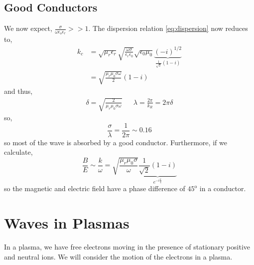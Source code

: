 \documentclass{book}
\begin{document}
\subsection{Good Conductors}
We now expect, $\frac{\sigma}{\omega\epsilon_o\epsilon_r} >> 1$. The dispersion relation \eqref{eq:dispersion} now reduces to,
\begin{equation}
	\begin{split}
	k_c & = \sqrt{\mu_r\epsilon_r}\sqrt{\frac{\omega\sigma}{\epsilon_r\epsilon_0}}\sqrt{\epsilon_0\mu_0}\underbrace{(-i)^{1/2}}_{\frac{1}{\sqrt{2}}(1-i)} \\
	& = \sqrt{\frac{\mu_r\mu_0\sigma\omega}{2}}(1-i)
\end{split}
\end{equation}
and thus,
\begin{align}
	\delta = \sqrt{\frac{2}{\mu_r\mu_0\sigma\omega}} &&\lambda = \frac{2\pi}{k_R} = 2\pi\delta
\end{align}
so,
\begin{equation}
	\frac{\sigma}{\lambda} = \frac{1}{2\pi} \sim 0.16
\end{equation}
so most of the wave is absorbed by a good conductor. Furthermore, if we calculate,
\begin{equation}
	\frac{B}{E} \sim \frac{k}{\omega} = \sqrt{\frac{\mu_r\mu_0\sigma}{\omega}}\underbrace{\frac{1}{\sqrt{2}}(1-i)}_{e^{-i\frac{\pi}{4}}}
\end{equation}
so the magnetic and electric field have a phase difference of $45^{\text{o}}$ in a conductor.
\section{Waves in Plasmas}
In a plasma, we have free electrons moving in the presence of stationary positive and neutral ions. We will consider the motion of the electrons in a plasma.
\end{document}

